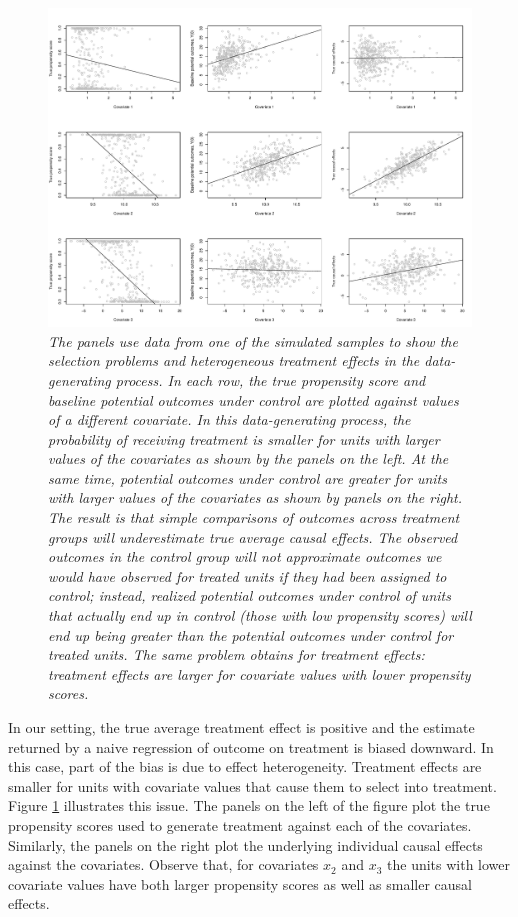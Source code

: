 \documentclass[hidelinks,11pt]{article}
\begin{document}
\begin{figure}
  \includegraphics[width=\linewidth]{../plots/selection.pdf}
  \caption{\emph{The panels use data from one of the simulated samples to show the selection problems and heterogeneous treatment effects in the data-generating process. In each row, the true propensity score and baseline potential outcomes under control are plotted against values of a different covariate. In this data-generating process, the probability of receiving treatment is smaller for units with larger values of the covariates as shown by the panels on the left. At the same time, potential outcomes under control are greater for units with larger values of the covariates as shown by panels on the right. The result is that simple comparisons of outcomes across treatment groups will underestimate true average causal effects. The observed outcomes in the control group will not approximate outcomes we would have observed for treated units if they had been assigned to control; instead, realized potential outcomes under control of units that actually end up in control (those with low propensity scores) will end up being greater than the potential outcomes under control for treated units. The same problem obtains for treatment effects: treatment effects are larger for covariate values with lower propensity scores.}}
  \label{selection}
\end{figure}


In our setting, the true average treatment effect is positive and the estimate returned by a naive regression of outcome on treatment is biased downward. In this case, part of the bias is due to effect heterogeneity. Treatment effects are smaller for units with covariate values that cause them to select into treatment. Figure \ref{selection} illustrates this issue. The panels on the left of the figure plot the true propensity scores used to generate treatment against each of the covariates. Similarly, the panels on the right plot the underlying individual causal effects against the covariates. Observe that, for covariates $x_2$ and $x_3$ the units with lower covariate values have both larger propensity scores as well as smaller causal effects.
\end{document}
